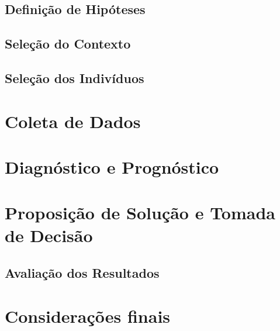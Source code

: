 \subsection{Definição de Hipóteses}

\subsection{Seleção do Contexto}

\subsection{Seleção dos Indivíduos}


\section{Coleta de Dados}

\section{Diagnóstico e Prognóstico}

\section{Proposição de Solução e Tomada de Decisão}

\subsection{Avaliação dos Resultados}

\section{Considerações finais}







